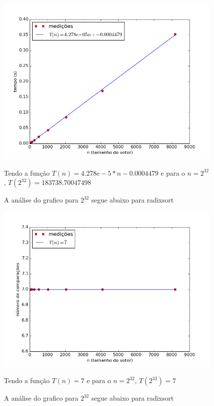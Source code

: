 \documentclass[12pt,a4paper,twoside]{report}
\begin{document}


\begin{figure}[ht]
\centering \includegraphics[scale=0.8]{../radixsort/imagens/radixsortCrescente0.png}
\caption{A análise do grafico para $2^{32}$ segue abaixo para radixsort}

Tendo a função $T(n) = 4.278\mathrm{e}-5*n-0.0004479$ e para o $n =2^{32}$, $T(2^{32}) = 183738.70047498$
\label{fig:radixsortCrescente0}
\end{figure}

\begin{figure}[ht]
\centering \includegraphics[scale=0.8]{../radixsort/imagens/radixsortCrescente1.png}
\caption{A análise do grafico para $2^{32}$ segue abaixo para radixsort}

Tendo a função $T(n) = 7$ e para o $n =2^{32}$, $T(2^{32}) =7$
\label{fig:radixsortCrescente1}
\end{figure}
\end{document}
